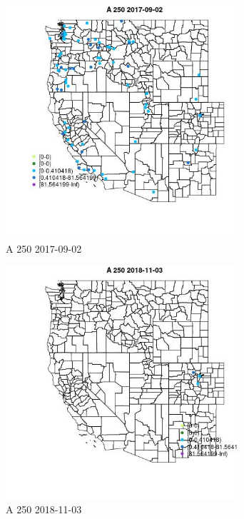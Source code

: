 \begin{figure} 
\centering  
\includegraphics[width=0.77\textwidth]{Code_Outputs/Report_ML_input_PM25_Step4_part_e_de_duplicated_aveswNAs_MapObsA_2502017-09-02.jpg} 
\caption{\label{fig:Report_ML_input_PM25_Step4_part_e_de_duplicated_aveswNAsMapObsA_2502017-09-02}A 250 2017-09-02} 
\end{figure} 
 

\begin{figure} 
\centering  
\includegraphics[width=0.77\textwidth]{Code_Outputs/Report_ML_input_PM25_Step4_part_e_de_duplicated_aveswNAs_MapObsA_2502018-11-03.jpg} 
\caption{\label{fig:Report_ML_input_PM25_Step4_part_e_de_duplicated_aveswNAsMapObsA_2502018-11-03}A 250 2018-11-03} 
\end{figure} 
 

